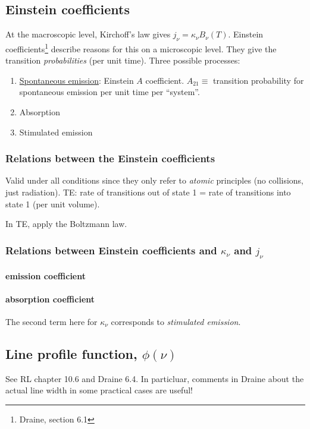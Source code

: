 \documentclass[11pt]{article}
\newcommand{\mar}[1]{\hspace{0pt}\marginpar{-\textcolor{black}{#1}-}}
\begin{document}
\subsection{Einstein coefficients}
At the macroscopic level, Kirchoff's law gives $ j_{\nu} = \kappa_{\nu}
B_{\nu}(T) $. Einstein coefficients\footnote{Draine, section 6.1} describe
reasons for this on a microscopic level. They give the transition
\emph{probabilities} (per unit time). Three possible processes:
\begin{enumerate}[noitemsep]
    \item \underline{Spontaneous emission}: Einstein $A$ coefficient.
        $A_{21} \equiv$ transition probability for spontaneous emission
        per unit time per ``system''.
    \item Absorption
    \item \mar{29}Stimulated emission
\end{enumerate}

\subsubsection{Relations between the Einstein coefficients}
Valid under all conditions since they only refer to \emph{atomic} principles
(no collisions, just radiation).
TE: rate of transitions out of state 1 = rate of transitions into state 1
(per unit volume).

In\mar{30} TE, apply the Boltzmann law.

\subsubsection{Relations between Einstein coefficients and $\kappa_{\nu}$ and $j_{\nu}$}
\paragraph{emission coefficient}
\paragraph{absorption coefficient}

The\mar{31} second term here for $\kappa_{\nu}$ corresponds to
\emph{stimulated emission}.

\subsection{Line profile function, $\phi(\nu)$}
See RL chapter 10.6 and Draine 6.4. In particluar, comments in Draine about
the actual line width in some practical cases are useful!
\end{document}
